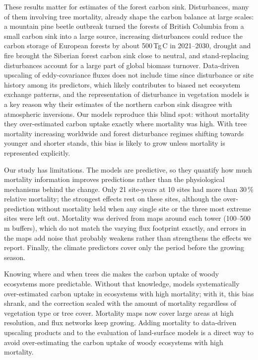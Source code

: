 \documentclass[11pt,a4paper]{article}
\begin{document}
These results matter for estimates of the forest carbon sink. Disturbances, many of them involving tree mortality,
already shape the carbon balance at large scales: a mountain pine beetle outbreak turned the forests of British Columbia
from a small carbon sink into a large source\cite{kurz2008mountain}, increasing disturbances could reduce the carbon
storage of European forests by about 500\,Tg\,C in 2021--2030\cite{seidl2014increasing}, drought and fire brought the
Siberian forest carbon sink close to neutral\cite{fan2022siberian}, and stand-replacing disturbances account for a large
part of global biomass turnover\cite{pugh2019important}. Data-driven upscaling of eddy-covariance fluxes does not include
time since disturbance or site history among its predictors, which likely contributes to biased net ecosystem exchange
patterns\cite{jung2020scaling}, and the representation of disturbance in vegetation models is a key reason why their
estimates of the northern carbon sink disagree with atmospheric inversions\cite{osullivan2024role}. Our models reproduce
this blind spot: without mortality they over-estimated carbon uptake exactly where mortality was high. With tree
mortality increasing worldwide\cite{allen2009global,hammond2022global,hartmann2022climate} and forest disturbance
regimes shifting towards younger and shorter stands\cite{mcdowell2020pervasive,seidl2017forest}, this bias is likely to
grow unless mortality is represented explicitly.

Our study has limitations. The models are predictive, so they quantify how much mortality information improves
predictions rather than the physiological mechanisms behind the change. Only 21 site-years at 10 sites had more than
30\,\% relative mortality; the strongest effects rest on these sites, although the over-prediction without mortality held
when any single site or the three most extreme sites were left out. Mortality was derived from maps around each tower
(100--500\,m buffers), which do not match the varying flux footprint exactly, and errors in the maps add noise that
probably weakens rather than strengthens the effects we report. Finally, the climate predictors cover only the period
before the growing season.

Knowing where and when trees die makes the carbon uptake of woody ecosystems more predictable. Without that knowledge, models
systematically over-estimated carbon uptake in ecosystems with high mortality; with it, this bias shrank, and the correction
scaled with the amount of mortality regardless of vegetation type or tree cover. Mortality maps now cover large areas
at high resolution\cite{mosig2025deadtrees}, and flux networks keep growing. Adding mortality to data-driven upscaling
products and to the evaluation of land-surface models is a direct way to avoid over-estimating the carbon uptake of
woody ecosystems with high mortality.
\end{document}
